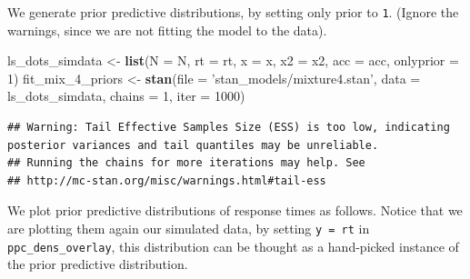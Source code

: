 \documentclass[12pt,]{krantz}
\newenvironment{Shaded}{\begin{snugshade}}{\end{snugshade}}
\newcommand{\DataTypeTok}[1]{\textcolor[rgb]{0.13,0.29,0.53}{#1}}
\newcommand{\DecValTok}[1]{\textcolor[rgb]{0.00,0.00,0.81}{#1}}
\newcommand{\KeywordTok}[1]{\textcolor[rgb]{0.13,0.29,0.53}{\textbf{#1}}}
\newcommand{\NormalTok}[1]{#1}
\newcommand{\OperatorTok}[1]{\textcolor[rgb]{0.81,0.36,0.00}{\textbf{#1}}}
\newcommand{\StringTok}[1]{\textcolor[rgb]{0.31,0.60,0.02}{#1}}
\theoremstyle{definition}
\theoremstyle{definition}
\theoremstyle{definition}
\theoremstyle{remark}
\begin{document}
We generate prior predictive distributions, by setting only prior to \texttt{1}. (Ignore the warnings, since we are not fitting the model to the data).

\begin{Shaded}
\begin{Highlighting}[]
\NormalTok{ls_dots_simdata <-}\StringTok{ }\KeywordTok{list}\NormalTok{(}\DataTypeTok{N =}\NormalTok{ N,}
                        \DataTypeTok{rt =}\NormalTok{ rt,}
                        \DataTypeTok{x =}\NormalTok{ x,}
                        \DataTypeTok{x2 =}\NormalTok{ x2,}
                        \DataTypeTok{acc =}\NormalTok{ acc,}
                        \DataTypeTok{onlyprior =} \DecValTok{1}\NormalTok{) }
\NormalTok{fit_mix_}\DecValTok{4}\NormalTok{_priors <-}\StringTok{ }\KeywordTok{stan}\NormalTok{(}\DataTypeTok{file =} \StringTok{'stan_models/mixture4.stan'}\NormalTok{,}
                         \DataTypeTok{data =}\NormalTok{ ls_dots_simdata,}
                         \DataTypeTok{chains =} \DecValTok{1}\NormalTok{, }\DataTypeTok{iter =} \DecValTok{1000}\NormalTok{)  }
\end{Highlighting}
\end{Shaded}

\begin{verbatim}
## Warning: Tail Effective Samples Size (ESS) is too low, indicating posterior variances and tail quantiles may be unreliable.
## Running the chains for more iterations may help. See
## http://mc-stan.org/misc/warnings.html#tail-ess
\end{verbatim}

We plot prior predictive distributions of response times as follows. Notice that we are plotting them again our simulated data, by setting \texttt{y\ =\ rt} in \texttt{ppc\_dens\_overlay}, this distribution can be thought as a hand-picked instance of the prior predictive distribution.

\begin{Shaded}
\end{Shaded}
\end{document}
